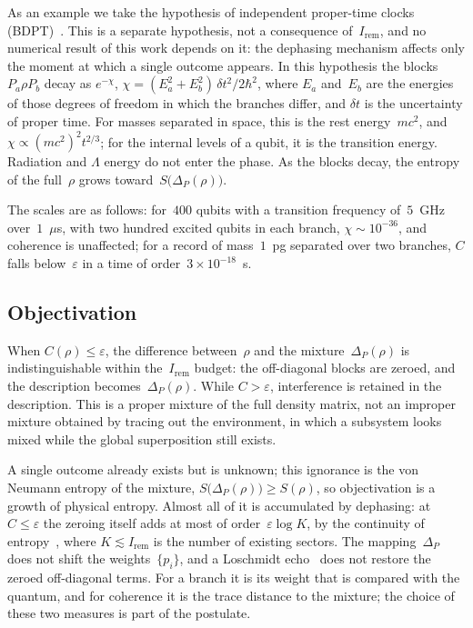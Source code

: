\documentclass[11pt,a4paper]{article}
\newcommand{\Ost}{I_{\mathrm{rem}}}
\begin{document}
As an example we take the hypothesis of independent proper-time clocks (BDPT)~\cite{ponfilenok2026bdpt}. This is a separate hypothesis, not a consequence of~$\Ost$, and no numerical result of this work depends on it: the dephasing mechanism affects only the moment at which a single outcome appears. In this hypothesis the blocks $P_a\rho P_b$ decay as $e^{-\chi}$, $\chi=(E_a^2+E_b^2)\,\delta t^2/2\hbar^2$, where $E_a$ and~$E_b$ are the energies of those degrees of freedom in which the branches differ, and $\delta t$ is the uncertainty of proper time. For masses separated in space, this is the rest energy~$mc^2$, and $\chi\propto(mc^2)^2t^{2/3}$; for the internal levels of a qubit, it is the transition energy. Radiation and $\Lambda$ energy do not enter the phase. As the blocks decay, the entropy of the full~$\rho$ grows toward~$S\bigl(\Delta_P(\rho)\bigr)$.

The scales are as follows: for~$400$ qubits with a transition frequency of~$5$~GHz over~$1$~$\mu$s, with two hundred excited qubits in each branch, $\chi\sim10^{-36}$, and coherence is unaffected; for a record of mass~$1$~pg separated over two branches, $C$ falls below~$\varepsilon$ in a time of order~$3\times10^{-18}$~s.

\subsection{Objectivation}
\label{sec:objectivation}

When $C(\rho)\le\varepsilon$, the difference between~$\rho$ and the mixture~$\Delta_P(\rho)$ is indistinguishable within the~$\Ost$ budget: the off-diagonal blocks are zeroed, and the description becomes~$\Delta_P(\rho)$. While $C>\varepsilon$, interference is retained in the description. This is a proper mixture of the full density matrix, not an improper mixture obtained by tracing out the environment, in which a subsystem looks mixed while the global superposition still exists.

A single outcome already exists but is unknown; this ignorance is the von Neumann entropy of the mixture, $S\bigl(\Delta_P(\rho)\bigr)\ge S(\rho)$, so objectivation is a growth of physical entropy. Almost all of it is accumulated by dephasing: at $C\le\varepsilon$ the zeroing itself adds at most of order~$\varepsilon\log K$, by the continuity of entropy~\cite{fannes1973,audenaert2007}, where $K\lesssim\Ost$ is the number of existing sectors. The mapping~$\Delta_P$ does not shift the weights~$\{p_i\}$, and a Loschmidt echo~\cite{swingle2018} does not restore the zeroed off-diagonal terms. For a branch it is its weight that is compared with the quantum, and for coherence it is the trace distance to the mixture; the choice of these two measures is part of the postulate.
\end{document}
